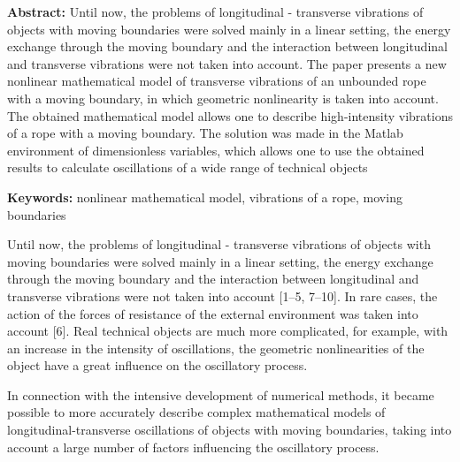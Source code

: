 ﻿


\vzmscaption

\noindent \textbf{Abstract:} Until now, the problems of longitudinal - transverse vibrations of objects with moving boundaries were solved mainly in a linear setting,
the energy exchange through the moving boundary and the interaction between longitudinal and transverse vibrations were not taken into account.
The paper presents a new nonlinear mathematical model of transverse vibrations of an unbounded rope with a moving boundary, in which geometric nonlinearity is taken into account.
The obtained mathematical model allows one to describe high-intensity vibrations of a rope with a moving boundary. The solution was made in the Matlab environment of dimensionless variables,
which allows one to use the obtained results to calculate oscillations of a wide range of technical objects

\noindent \textbf{Keywords:} nonlinear mathematical model, vibrations of a rope, moving boundaries



Until now, the problems of longitudinal - transverse vibrations of objects with moving boundaries were solved mainly in a linear setting, the energy exchange through the moving boundary and the interaction between longitudinal and transverse vibrations were not taken into account [1--5, 7--10]. In rare cases, the action of the forces of resistance of the external environment was taken into account [6]. Real technical objects are much more complicated, for example, with an increase in the intensity of oscillations, the geometric nonlinearities of the object have a great influence on the oscillatory process.

In connection with the intensive development of numerical methods, it became possible to more accurately describe complex mathematical models of longitudinal-transverse oscillations of objects with moving boundaries, taking into account a large number of factors influencing the oscillatory process.

